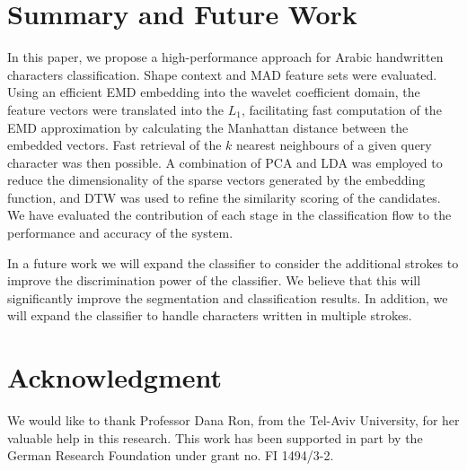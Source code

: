 \documentclass[10pt, conference, compsocconf]{IEEEtran}
\begin{document}
\section{Summary and Future Work}
\label{sec:summary_future_work}
In this paper, we propose a high-performance approach for Arabic handwritten characters classification.
Shape context and MAD feature sets were evaluated. 
Using an efficient EMD embedding into the wavelet coefficient domain, the feature vectors were translated into the $L_1$, facilitating fast computation of the EMD approximation by calculating the Manhattan distance between the embedded vectors.
Fast retrieval of the $k$ nearest neighbours of a given query character was then possible.
A combination of PCA and LDA was employed to reduce the dimensionality of the sparse vectors generated by the embedding function, and DTW was used to refine the similarity scoring of the candidates.
We have evaluated the contribution of each stage in the classification flow to the performance and accuracy of the system.

In a future work we will expand the classifier to consider the additional strokes to improve the discrimination power of the classifier. 
We believe that this will significantly improve the segmentation and classification results.
In addition, we will expand the classifier to handle characters written in multiple strokes.

\section*{Acknowledgment}
We would like to thank Professor Dana Ron, from the Tel-Aviv University, for her valuable help in this research. 
This work has been supported in part by the German Research Foundation under grant no. FI 1494/3-2.




\end{document}
